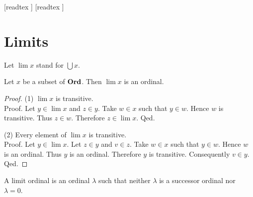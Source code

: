 \documentclass[10pt]{article}
\begin{document}
  \begin{imports}
    \begin{forthel}
      [readtex ]
      [readtex ]
    \end{forthel}
  \end{imports}


  \section*{Limits}

  \begin{forthel}
    Let $\lim x$ stand for $\bigcup x$.
  \end{forthel}

  \begin{forthel}
    \begin{proposition}
      Let $x$ be a subset of $\textbf{Ord}$.
      Then $\lim x$ is an ordinal.
    \end{proposition}
    \begin{proof}
      (1) $\lim x$ is transitive. \\
      Proof.
        Let $y \in \lim x$ and $z \in y$.
        Take $w \in x$ such that $y \in w$.
        Hence $w$ is transitive.
        Thus $z \in w$.
        Therefore $z \in \lim x$.
      Qed.

      (2) Every element of $\lim x$ is transitive. \\
      Proof.
        Let $y \in \lim x$.
        Let $z \in y$ and $v \in z$.
        Take $w \in x$ such that $y \in w$.
        Hence $w$ is an ordinal.
        Thus $y$ is an ordinal.
        Therefore $y$ is transitive.
        Consequently $v \in y$.
      Qed.
    \end{proof}
  \end{forthel}

  \begin{forthel}
    \begin{definition}
      A limit ordinal is an ordinal $\lambda$ such that neither $\lambda$ is a successor ordinal nor $\lambda = 0$.
    \end{definition}
  \end{forthel}
\end{document}
